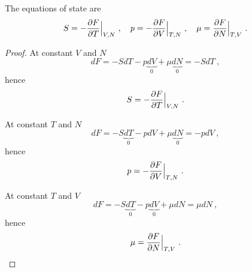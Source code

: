     The equations of state are
    \begin{equation}\label{fes}
        S = - \frac{\partial F}{\partial T} \Big \vert_{V,N} ~, \quad p = - \frac{\partial F}{\partial V} \Big \vert_{T,N} ~, \quad \mu = \frac{\partial F}{\partial N} \Big \vert_{T,V} ~. 
    \end{equation}
    \begin{proof}
        At constant $V$ and $N$
        \begin{equation*}
            dF = - S dT - p \underbrace{dV}_0 + \mu \underbrace{dN}_0 = - S dT~,
        \end{equation*}
        hence 
        \begin{equation*}
            S = - \frac{\partial F}{\partial T} \Big \vert_{V,N} ~.
        \end{equation*}

        At constant $T$ and $N$
        \begin{equation*}
            dF = - S \underbrace{dT}_0 - p dV + \mu \underbrace{dN}_0 = - pdV ~,
        \end{equation*}
        hence 
        \begin{equation*}
            p = - \frac{\partial F}{\partial V} \Big \vert_{T,N} ~.
        \end{equation*}

        At constant $T$ and $V$
        \begin{equation*}
            dF = - S \underbrace{dT}_0 - p \underbrace{dV}_0 + \mu dN = \mu dN~,
        \end{equation*}
        hence 
        \begin{equation*}
            \mu = \frac{\partial F}{\partial N} \Big \vert_{T,V} ~.
        \end{equation*}
    \end{proof}

